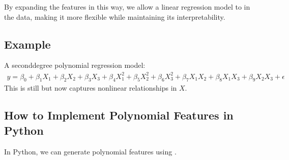 \documentclass[letterpaper,10pt,english]{jupyterBook}
\begin{document}
\sphinxAtStartPar
By expanding the features in this way, we allow a linear regression model to  in the data, making it more flexible while maintaining its interpretability.


\subsection{Example}
\label{\detokenize{02:example}}
\sphinxAtStartPar
A second\sphinxhyphen{}degree polynomial regression model:
\begin{equation*}
\begin{split}
y = \beta_0 + \beta_1 X_1 + \beta_2 X_2 + \beta_3 X_3 + \beta_4 X_1^2 + \beta_5 X_2^2 + \beta_6 X_3^2 + \beta_7 X_1X_2 + \beta_8 X_1X_3 + \beta_9 X_2X_3 + \epsilon
\end{split}
\end{equation*}
\sphinxAtStartPar
This is still  but now captures non\sphinxhyphen{}linear relationships in \(X\).


\subsection{How to Implement Polynomial Features in Python}
\label{\detokenize{02:how-to-implement-polynomial-features-in-python}}
\sphinxAtStartPar
In Python, we can generate polynomial features using .
\end{document}
